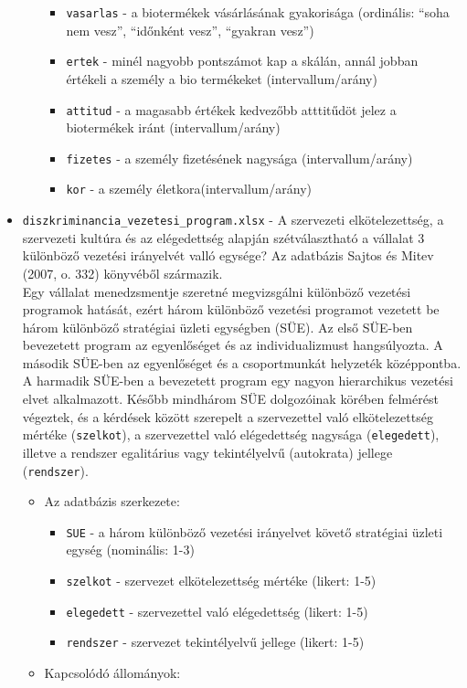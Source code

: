 \documentclass[
  letterpaper,
]{krantz}
\providecommand{\tightlist}{%
  \setlength{\itemsep}{0pt}\setlength{\parskip}{0pt}}\usepackage{longtable,booktabs,array}
\begin{document}
\begin{itemize}
\begin{itemize}
    \begin{itemize}
    \tightlist
    \item
      \texttt{vasarlas} - a biotermékek vásárlásának gyakorisága
      (ordinális: ``soha nem vesz'', ``időnként vesz'', ``gyakran
      vesz'')
    \item
      \texttt{ertek} - minél nagyobb pontszámot kap a skálán, annál
      jobban értékeli a személy a bio termékeket (intervallum/arány)
    \item
      \texttt{attitud} - a magasabb értékek kedvezőbb atttitűdöt jelez a
      biotermékek iránt (intervallum/arány)
    \item
      \texttt{fizetes} - a személy fizetésének nagysága
      (intervallum/arány)
    \item
      \texttt{kor} - a személy életkora(intervallum/arány)
    \end{itemize}
  \end{itemize}
\item
  \texttt{diszkriminancia\_vezetesi\_program.xlsx} - A szervezeti
  elkötelezettség, a szervezeti kultúra és az elégedettség alapján
  szétválasztható a vállalat 3 különböző vezetési irányelvét valló
  egysége? Az adatbázis Sajtos és Mitev (2007, o. 332) könyvéből
  származik.\\
  Egy vállalat menedzsmentje szeretné megvizsgálni különböző vezetési
  programok hatását, ezért három különböző vezetési programot vezetett
  be három különböző stratégiai üzleti egységben (SÜE). Az első SÜE-ben
  bevezetett program az egyenlőséget és az individualizmust
  hangsúlyozta. A második SÜE-ben az egyenlőséget és a csoportmunkát
  helyzeték középpontba. A harmadik SÜE-ben a bevezetett program egy
  nagyon hierarchikus vezetési elvet alkalmazott. Később mindhárom SÜE
  dolgozóinak körében felmérést végeztek, és a kérdések között szerepelt
  a szervezettel való elkötelezettség mértéke (\texttt{szelkot}), a
  szervezettel való elégedettség nagysága (\texttt{elegedett}), illetve
  a rendszer egalitárius vagy tekintélyelvű (autokrata) jellege
  (\texttt{rendszer}).

  \begin{itemize}
  \tightlist
  \item
    Az adatbázis szerkezete:

    \begin{itemize}
    \tightlist
    \item
      \texttt{SUE} - a három különböző vezetési irányelvet követő
      stratégiai üzleti egység (nominális: 1-3)
    \item
      \texttt{szelkot} - szervezet elkötelezettség mértéke (likert: 1-5)
    \item
      \texttt{elegedett} - szervezettel való elégedettség (likert: 1-5)
    \item
      \texttt{rendszer} - szervezet tekintélyelvű jellege (likert: 1-5)
    \end{itemize}
  \item
    Kapcsolódó állományok:


\end{itemize}
\end{itemize}
\end{document}
